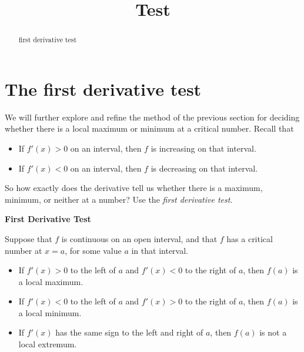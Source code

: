 \documentclass{ximera}
\title {Test}
\begin{document}
\begin{abstract}
first derivative test 
\end{abstract}
\maketitle





\section*{The first derivative test}

We will further explore and refine the method of the previous section for deciding whether there is a
local maximum or minimum at a critical number.
 Recall that
\begin{itemize}
\item If $f'(x) >0$ on an interval, then $f$ is increasing on that interval.
\item If $f'(x) <0$ on an interval, then $f$ is decreasing on that interval.
\end{itemize}

So how exactly does the derivative tell us whether there is a maximum,
minimum, or neither at a number? Use the \textit{first derivative test}.

\begin{theorem}  \textbf{\textcolor{-red!75!green}{First Derivative Test}} \label{T:fdt}



Suppose that $f$ is continuous on an open interval, and that $f$  has a critical number
at $x=a$, for some value $a$ in that interval.
\begin{itemize}
\item If $f'(x)>0$ to the left of $a$ and $f'(x)<0$ to the right of
  $a$, then $f(a)$ is a local maximum.
\item If $f'(x)<0$ to the left of $a$ and $f'(x)>0$ to the right of
  $a$, then $f(a)$ is a local minimum.
\item If $f'(x)$ has the same sign to the left and right of $a$,
  then $f(a)$ is not a local extremum.
\end{itemize}
\end{theorem}
\end{document}
